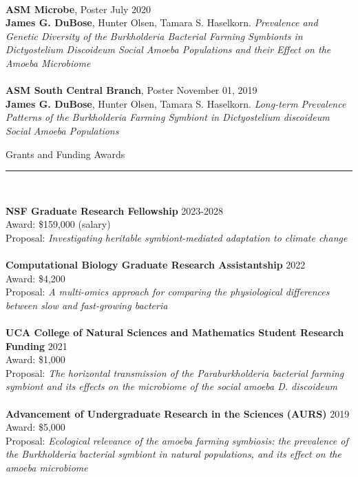 \documentclass{article}
\begin{document}
\\
\textbf{ASM Microbe}, Poster \hfill July 2020\\
\textbf{James G. DuBose}, Hunter Olsen, Tamara S. Haselkorn. \emph{Prevalence and Genetic Diversity
of the Burkholderia Bacterial Farming Symbionts in Dictyostelium Discoideum Social Amoeba Populations and their Effect on the Amoeba Microbiome}\\
\\
\textbf{ASM South Central Branch}, Poster \hfill November 01, 2019\\
\textbf{James G. DuBose}, Hunter Olsen, Tamara S. Haselkorn. \emph{Long-term Prevalence Patterns of the Burkholderia Farming Symbiont in Dictyostelium discoideum Social Amoeba Populations}
\\
\begin{flushleft}
{\Large Grants and Funding Awards} \rule{16.51cm}{0.4pt}\\
\end{flushleft}
\textbf{NSF Graduate Research Fellowship} \hfill 2023-2028\\
Award: \$159,000 (salary)\\
Proposal: \emph{Investigating heritable symbiont-mediated adaptation to climate change}\\
\\
\textbf{Computational Biology Graduate Research Assistantship} \hfill 2022\\
Award: \$4,200\\
Proposal: \emph{A multi-omics approach for comparing the physiological differences between slow and fast-growing bacteria}\\
\\
\textbf{UCA College of Natural Sciences and Mathematics Student Research Funding} \hfill 2021\\
Award: \$1,000\\
Proposal: \emph{The horizontal transmission of the Paraburkholderia bacterial farming symbiont and its effects on the microbiome of the social amoeba D. discoideum}\\
\\
\textbf{Advancement of Undergraduate Research in the Sciences (AURS)} \hfill 2019\\
Award: \$5,000\\
Proposal: \emph{Ecological relevance of the amoeba farming symbiosis: the prevalence of the Burkholderia bacterial symbiont in natural populations, and its effect on the amoeba microbiome}
\\
\end{document}
